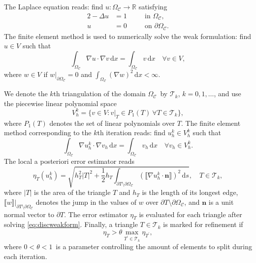 \documentclass[11pt]{article}
\begin{document}
The Laplace equation reads: find $u : \Omega_{\mathcal{C}} \rightarrow \mathbb{R}$ satisfying
\begin{alignat}{2}
-\Delta u &= 1 \quad && \text{in $\Omega_{\mathcal{C}}$,} \\
u &= 0 \quad && \text{on $\partial \Omega_{\mathcal{C}}$.}
\end{alignat}
The finite element method is used to numerically solve the
weak formulation: find \(u \in V\) such that
\begin{equation}
   \label{eq:weakform}
   \int_{\Omega_{\mathcal{C}}} \nabla u \cdot \nabla v \,\mathrm{d}x = \int_{\Omega_{\mathcal{C}}} v\,\mathrm{d}x \quad \forall v \in V,
\end{equation}
where
\(w \in V\) if \(w |_{\partial \Omega_{\mathcal{C}}} = 0\) and
$
   \int_{\Omega_{\mathcal{C}}} (\nabla w)^2 \,\mathrm{d}x < \infty.
$

We denote the \(k\)th triangulation of the
domain \(\Omega_{\mathcal{C}}\) by \(\mathcal{T}_k\), \(k=0,1,\dots\), and
use the piecewise linear polynomial space
$$V_h^k = \{ v \in V : v|_T \in P_1(T)~\forall T \in \mathcal{T}_k \},$$
where $P_1(T)$ denotes the set of linear polynomials over $T$.
The finite element method corresponding to the \(k\)th iteration reads:
find \(u_h^k \in V_h^k\) such that
\begin{equation}
   \label{eq:discweakform}
   \int_{\Omega_{\mathcal{C}}} \nabla u_h^k \cdot \nabla v_h \,\mathrm{d}x = \int_{\Omega_{\mathcal{C}}} v_h\,\mathrm{d}x \quad \forall v_h \in V_h^k.
\end{equation}
The local a posteriori error estimator
reads
\begin{equation}
        \eta_T(u_h^k) = \sqrt{h_T^2 |T|^2 + \frac12 h_T \int_{\partial T \setminus \partial \Omega_{\mathcal{C}}} (\llbracket \nabla u_h^k \cdot \boldsymbol{n} \rrbracket)^2 \,\mathrm{d}s}, \quad T \in \mathcal{T}_k,
\end{equation}
where $|T|$ is the area of the triangle $T$ and $h_T$ is the length of its longest edge, $\llbracket w \rrbracket |_{\partial T \setminus \partial \Omega_{\mathcal{C}}}$ denotes the jump in the values of
$w$ over $\partial T \setminus \partial \Omega_{\mathcal{C}}$, and $\boldsymbol{n}$ is a unit normal vector to
$\partial T$.
The error estimator $\eta_T$ is evaluated for each triangle
after solving \eqref{eq:discweakform}.
Finally, a triangle $T \in \mathcal{T}_k$ is marked for refinement if
\begin{equation}
  \label{eq:adaptivetheta}
   \eta_T > \theta \max_{T^\prime \in \mathcal{T}_k} \eta_{T^\prime},
\end{equation}
where $0 < \theta < 1$ is a parameter controlling the amount
of elements to split during each iteration.
\end{document}
